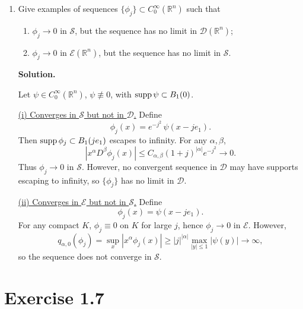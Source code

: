 \documentclass[12pt,a4paper]{article}
\theoremstyle{plain}
\theoremstyle{definition}
\theoremstyle{remark}
\theoremstyle{remark}
\begin{document}
\begin{enumerate}
	\item[(c)]
	Give examples of sequences $\{\phi_j\}\subset C_0^\infty(\mathbb{R}^n)$ such that
	\begin{enumerate}
		\item[(i)] $\phi_j\to 0$ in $\mathcal{S}$, but the sequence has no limit in
		$\mathcal{D}(\mathbb{R}^n)$;
		\item[(ii)] $\phi_j\to 0$ in $\mathcal{E}(\mathbb{R}^n)$, but the sequence has
		no limit in $\mathcal{S}$.
	\end{enumerate}
	
	\medskip
	\textbf{Solution.}
	
	Let $\psi\in C_0^\infty(\mathbb{R}^n)$, $\psi\not\equiv0$, with
	${\rm supp}\,\psi\subset B_1(0)$.
	
	\medskip
	\underline{(i) Converges in $\mathcal{S}$ but not in $\mathcal{D}$.}
	Define
	\[
	\phi_j(x) = e^{-j^2}\,\psi(x - j e_1).
	\]
	Then ${\rm supp}\,\phi_j\subset B_1(je_1)$ escapes to infinity.
	For any $\alpha,\beta$,
	\[
	|x^\alpha D^\beta\phi_j(x)|
	\le C_{\alpha,\beta}(1+j)^{|\alpha|} e^{-j^2}\to 0.
	\]
	Thus $\phi_j\to0$ in $\mathcal{S}$.  
	However, no convergent sequence in $\mathcal{D}$ may have supports escaping to
	infinity, so $\{\phi_j\}$ has no limit in $\mathcal{D}$.
	
	\medskip
	\underline{(ii) Converges in $\mathcal{E}$ but not in $\mathcal{S}$.}
	Define
	\[
	\phi_j(x)=\psi(x - j e_1).
	\]
	For any compact $K$, $\phi_j\equiv 0$ on $K$ for large $j$, hence
	$\phi_j\to 0$ in $\mathcal{E}$.
	However,
	\[
	q_{\alpha,0}(\phi_j)
	= \sup_{x}|x^\alpha\phi_j(x)|
	\ge |j|^{|\alpha|}\max_{|y|\le 1}|\psi(y)|
	\to\infty,
	\]
	so the sequence does not converge in $\mathcal{S}$.
	
\end{enumerate}


\section*{Exercise 1.7}
\end{document}
